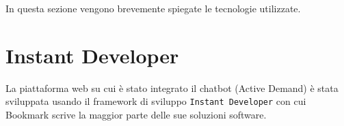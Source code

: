 In questa sezione vengono brevemente spiegate le tecnologie utilizzate.

\section{Instant Developer}
La piattaforma web su cui è stato integrato il chatbot (Active Demand) è stata sviluppata usando il framework di sviluppo \texttt{Instant Developer} con cui Bookmark scrive la maggior parte delle sue soluzioni software.
